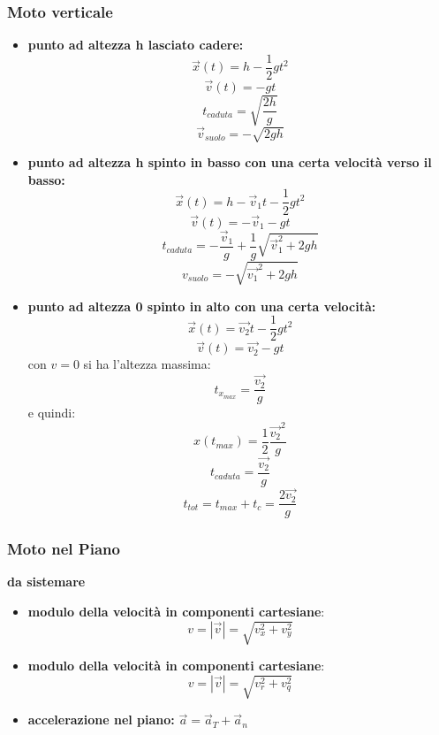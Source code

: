 \documentclass[a4paper,12pt, oneside]{book}
\begin{document}
\subsubsection{Moto verticale}
\begin{itemize}
\item \textbf{punto ad altezza h lasciato cadere:}
$$\vec{x}(t)=h-\frac{1}{2} g t^2$$
$$\vec{v}(t)=-gt$$
$$t_{caduta}=\sqrt{\frac{2 h}{g}}$$
$$\vec{v}_{suolo}=-\sqrt{2 g h}$$
\item \textbf{punto ad altezza h spinto in basso con una certa velocità verso il basso:}
$$\vec{x}(t)=h-\vec{v}_1t-\frac{1}{2} g t^2$$
$$\vec{v}(t)=-\vec{v}_1-gt$$
$$t_{caduta}=-\frac{\vec{v}_1}{g}+\frac{1}{g}\sqrt{\vec{v}_1^2+2gh}$$
$$v_{suolo}=-\sqrt{\vec{v_1}^2+2gh}$$
\item \textbf{punto ad altezza 0 spinto in alto con una certa velocità:}
$$\vec{x}(t)=\vec{v_2}t-\frac{1}{2} g t^2$$
$$\vec{v}(t)=\vec{v_2}-gt$$
con $v=0$ si ha l'altezza massima:
$$t_{x_{max}}=\frac{\vec{v_2}}{g}$$
e quindi:
$$x(t_{max})=\frac{1}{2}\frac{\vec{v_2}^2}{g}$$
$$t_{caduta}=\frac{\vec{v_2}}{g}$$
$$t_{tot}=t_{max}+t_c=\frac{2\vec{v_2}}{g}$$
\end{itemize}
\subsubsection{Moto nel Piano}\textbf{da sistemare}
\begin{itemize}
\item \textbf{modulo della velocità in componenti cartesiane}: $$v=|\vec{v}|=\sqrt{v_x^2+v_y^2}$$
\item \textbf{modulo della velocità in componenti cartesiane}: 
$$v=|\vec{v}|=\sqrt{v_r^2+v_q^2}$$
\item \textbf{accelerazione nel piano: }$\vec{a}=\vec{a}_T+\vec{a}_n$
\end{itemize}
\end{document}
